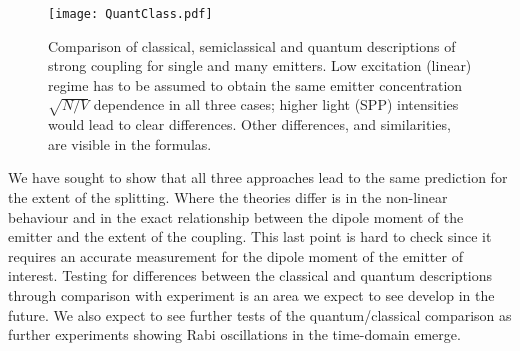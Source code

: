 \documentclass[12pt]{iopart}
\begin{document}
\begin{figure}
\texttt{[image: QuantClass.pdf]}
\caption{Comparison of classical, semiclassical and quantum descriptions of strong coupling
for single and many emitters. Low excitation (linear) regime has to be assumed to obtain the same 
emitter concentration $\sqrt{N/V}$ dependence in all three cases; higher light (SPP) intensities
would lead to clear differences. Other differences, and similarities, are visible in the formulas.}
\label{ClassSemiQuantum}
\end{figure}

We have sought to show that all three approaches lead to the same prediction for the extent of the splitting. Where the theories differ is in the non-linear behaviour and in the exact relationship between the dipole moment of the emitter and the extent of the coupling. This last point is hard to check since it requires an accurate measurement for the dipole moment of the emitter of interest. Testing for differences between the classical and quantum descriptions through comparison with experiment is an area we expect to see develop in the future. We also expect to see further tests of the quantum/classical comparison as further experiments showing Rabi oscillations in the time-domain emerge.
\end{document}
